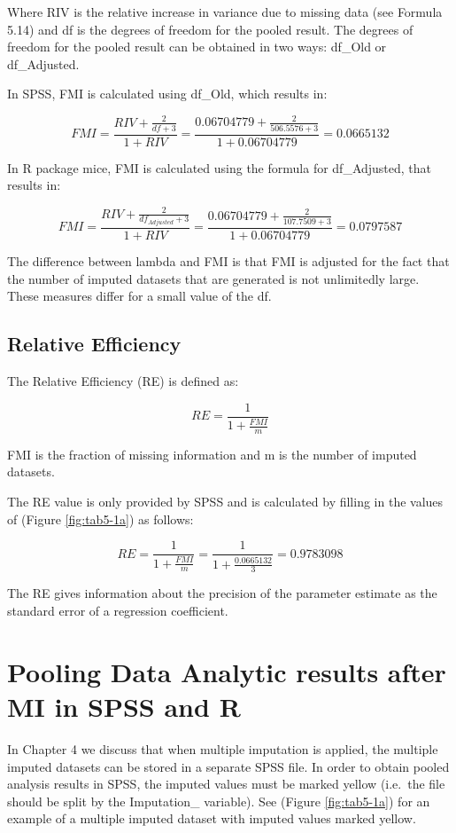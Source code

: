\documentclass[]{book}
\theoremstyle{definition}
\theoremstyle{definition}
\theoremstyle{definition}
\theoremstyle{remark}
\begin{document}
Where RIV is the relative increase in variance due to missing data (see
Formula 5.14) and df is the degrees of freedom for the pooled result.
The degrees of freedom for the pooled result can be obtained in two
ways: df\_Old or df\_Adjusted.

In SPSS, FMI is calculated using df\_Old, which results in:

\[FMI = \frac{RIV + \frac{2}{df+3}}{1+RIV}=\frac{0.06704779 + \frac{2}{506.5576+3}}{1+0.06704779}=0.0665132\]

In R package mice, FMI is calculated using the formula for df\_Adjusted,
that results in:

\[FMI = \frac{RIV + \frac{2}{df_{Adjusted}+3}}{1+RIV}=\frac{0.06704779 + \frac{2}{107.7509+3}}{1+0.06704779}=0.0797587\]

The difference between lambda and FMI is that FMI is adjusted for the
fact that the number of imputed datasets that are generated is not
unlimitedly large. These measures differ for a small value of the df.

\subsection{Relative Efficiency}\label{relative-efficiency}

The Relative Efficiency (RE) is defined as:

\begin{equation}
RE = \frac{1}{1+\frac{FMI}{m}}
  \label{eq:re}
\end{equation}

FMI is the fraction of missing information and m is the number of
imputed datasets.

The RE value is only provided by SPSS and is calculated by filling in
the values of (Figure \ref{fig:tab5-1a}) as follows:

\[RE = \frac{1}{1+\frac{FMI}{m}}=\frac{1}{1+\frac{0.0665132}{3}}=0.9783098\]

The RE gives information about the precision of the parameter estimate
as the standard error of a regression coefficient.

\section{Pooling Data Analytic results after MI in SPSS and
R}\label{pooling-data-analytic-results-after-mi-in-spss-and-r}

In Chapter 4 we discuss that when multiple imputation is applied, the
multiple imputed datasets can be stored in a separate SPSS file. In
order to obtain pooled analysis results in SPSS, the imputed values must
be marked yellow (i.e.~the file should be split by the Imputation\_
variable). See (Figure \ref{fig:tab5-1a}) for an example of a multiple
imputed dataset with imputed values marked yellow.
\end{document}
